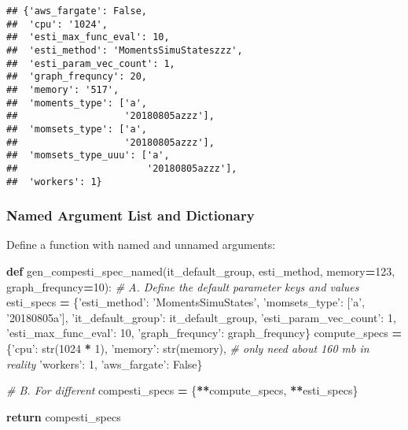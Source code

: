 \documentclass[
]{book}
\newenvironment{Shaded}{\begin{snugshade}}{\end{snugshade}}
\newcommand{\BuiltInTok}[1]{#1}
\newcommand{\CommentTok}[1]{\textcolor[rgb]{0.56,0.35,0.01}{\textit{#1}}}
\newcommand{\ControlFlowTok}[1]{\textcolor[rgb]{0.13,0.29,0.53}{\textbf{#1}}}
\newcommand{\DecValTok}[1]{\textcolor[rgb]{0.00,0.00,0.81}{#1}}
\newcommand{\KeywordTok}[1]{\textcolor[rgb]{0.13,0.29,0.53}{\textbf{#1}}}
\newcommand{\NormalTok}[1]{#1}
\newcommand{\OperatorTok}[1]{\textcolor[rgb]{0.81,0.36,0.00}{\textbf{#1}}}
\newcommand{\StringTok}[1]{\textcolor[rgb]{0.31,0.60,0.02}{#1}}
\newcommand{\VariableTok}[1]{\textcolor[rgb]{0.00,0.00,0.00}{#1}}
\begin{document}
\begin{verbatim}
## {'aws_fargate': False,
##  'cpu': '1024',
##  'esti_max_func_eval': 10,
##  'esti_method': 'MomentsSimuStateszzz',
##  'esti_param_vec_count': 1,
##  'graph_frequncy': 20,
##  'memory': '517',
##  'moments_type': ['a',
##                   '20180805azzz'],
##  'momsets_type': ['a',
##                   '20180805azzz'],
##  'momsets_type_uuu': ['a',
##                       '20180805azzz'],
##  'workers': 1}
\end{verbatim}

\hypertarget{named-argument-list-and-dictionary}{%
\subsubsection{Named Argument List and Dictionary}\label{named-argument-list-and-dictionary}}

Define a function with named and unnamed arguments:

\begin{Shaded}
\begin{Highlighting}[]
\KeywordTok{def}\NormalTok{ gen_compesti_spec_named(it_default_group, esti_method, memory}\OperatorTok{=}\DecValTok{123}\NormalTok{, graph_frequncy}\OperatorTok{=}\DecValTok{10}\NormalTok{):}
    \CommentTok{# A. Define the default parameter keys and values}
\NormalTok{    esti_specs }\OperatorTok{=}\NormalTok{ \{}\StringTok{'esti_method'}\NormalTok{: }\StringTok{'MomentsSimuStates'}\NormalTok{,}
                  \StringTok{'momsets_type'}\NormalTok{: [}\StringTok{'a'}\NormalTok{, }\StringTok{'20180805a'}\NormalTok{],}
                  \StringTok{'it_default_group'}\NormalTok{: it_default_group,}
                  \StringTok{'esti_param_vec_count'}\NormalTok{: }\DecValTok{1}\NormalTok{,}
                  \StringTok{'esti_max_func_eval'}\NormalTok{: }\DecValTok{10}\NormalTok{,}
                  \StringTok{'graph_frequncy'}\NormalTok{: graph_frequncy\}}
\NormalTok{    compute_specs }\OperatorTok{=}\NormalTok{ \{}\StringTok{'cpu'}\NormalTok{: }\BuiltInTok{str}\NormalTok{(}\DecValTok{1024} \OperatorTok{*} \DecValTok{1}\NormalTok{),}
                     \StringTok{'memory'}\NormalTok{: }\BuiltInTok{str}\NormalTok{(memory),  }\CommentTok{# only need about 160 mb in reality}
                     \StringTok{'workers'}\NormalTok{: }\DecValTok{1}\NormalTok{,}
                     \StringTok{'aws_fargate'}\NormalTok{: }\VariableTok{False}\NormalTok{\}}

    \CommentTok{# B. For different}
\NormalTok{    compesti_specs }\OperatorTok{=}\NormalTok{ \{}\OperatorTok{**}\NormalTok{compute_specs, }\OperatorTok{**}\NormalTok{esti_specs\}}

    \ControlFlowTok{return}\NormalTok{ compesti_specs}
\end{Highlighting}
\end{Shaded}
\end{document}
